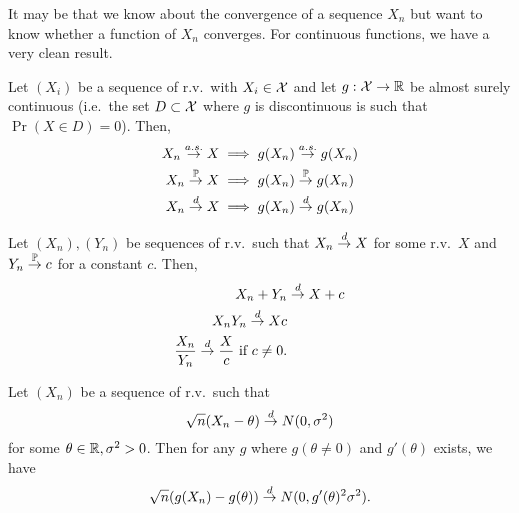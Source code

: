 It may be that we know about the convergence of a sequence $X_n$ but want 
to know whether a function of $X_n$ converges. For continuous functions, we 
have a very clean result.

\begin{theorem}
    Let $(X_i)$ be a sequence of r.v.\ with $X_i \in \mathcal X$ and let 
    $g: \mathcal X \rightarrow \mathbb R$ be almost surely continuous (i.e.\ the set $D \subset \mathcal X$
    where $g$ is discontinuous is such that $\Pr(X \in D) = 0$). Then,
    \begin{align*}
        X_n \overset{a.s.}{\rightarrow} X &\implies g(X_n) \overset{a.s.}{\rightarrow} g(X_n) \\
        X_n \overset{\operatorname*{\mathbb{P}}}{\rightarrow} X &\implies g(X_n) \overset{\operatorname*{\mathbb{P}}}{\rightarrow} g(X_n) \\
        X_n \overset{d}{\rightarrow} X &\implies g(X_n) \overset{d}{\rightarrow} g(X_n)
    \end{align*}
\end{theorem}

\begin{theorem}
    Let $(X_n), (Y_n)$ be sequences of r.v.\ such that 
    $X_n \overset{d}{\rightarrow} X$ for some r.v.\ $X$ and $Y_n \overset{\operatorname*{\mathbb{P}}}{\rightarrow} c$ for a constant $c$.
    Then,
    \begin{align*}
        X_n + Y_n &\overset{d}{\rightarrow} X + c \\
        X_n Y_n \overset{d}{\rightarrow} Xc \\
        \frac{X_n}{Y_n} \overset{d}{\rightarrow} \frac{X}{c} \text{ if } c \neq 0.
    \end{align*}
\end{theorem}

\begin{theorem}
    Let $(X_n)$ be a sequence of r.v.\ such that 
    \[
        \sqrt{n}(X_n - \theta)
        \overset{d}{\rightarrow}
        N(0, \sigma^2)    
    \]
    for some $\theta \in \mathbb R, \sigma^2 > 0$. Then for any $g$ where 
    $g(\theta \neq 0)$ and $g'(\theta)$ exists, we have
    \[
        \sqrt{n}(g(X_n) - g(\theta))
        \overset{d}{\rightarrow}
        N(0, g'(\theta)^2 \sigma^2).    
    \]
\end{theorem}

